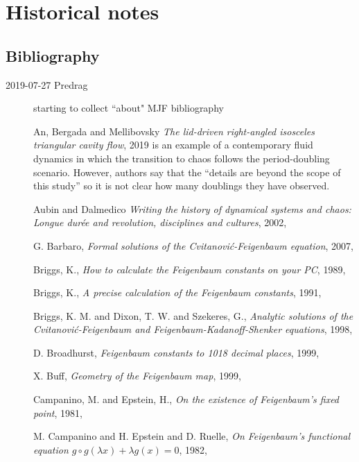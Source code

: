 

\chapter{Historical notes}
\label{c-history}

\section{Bibliography}
\label{sect:Others}

\begin{description}
\item[2019-07-27 Predrag]
starting to collect ``about" MJF bibliography

{An, Bergada and Mellibovsky}
{\em The lid-driven right-angled isosceles triangular cavity flow},
{2019}
is an example of a contemporary fluid dynamics in which the transition to
chaos follows the period-doubling scenario. However, authors say that the
``details are beyond the scope of this study'' so it is not clear how
many doublings they have observed.

Aubin and Dalmedico
{\em Writing the history of dynamical systems and chaos: {Longue}
dur{\'{e}}e and revolution, disciplines and cultures},
{2002},

{G. Barbaro},
{\em Formal solutions of the {Cvitanovi{\'c}-Feigenbaum} equation},
{2007},

{Briggs, K.},
{\em How to calculate the {Feigenbaum} constants on your {PC}},
{1989},

{Briggs, K.},
{\em A precise calculation of the {Feigenbaum} constants},
{1991},

{Briggs, K. M. and Dixon, T. W. and Szekeres, G.},
{\em Analytic solutions of the {Cvitanovi{\'c}-Feigenbaum} and {Feigenbaum-Kadanoff-Shenker} equations},
{1998},

{D. Broadhurst},
{\em Feigenbaum constants to 1018 decimal places},
{1999},

{X. Buff},
{\em Geometry of the {Feigenbaum} map},
{1999},

{Campanino, M. and Epstein, H.},
{\em On the existence of {Feigenbaum's} fixed point},
{1981},

{M. Campanino and H. Epstein and D. Ruelle},
{\em On {Feigenbaum}'s functional equation {$g \circ g(\lambda x) + \lambda g(x) = 0$}},
{1982},


\end{description}
